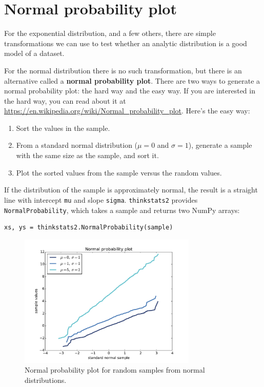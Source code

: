 \documentclass[12pt]{book}
\begin{document}
\section{Normal probability plot}

For the exponential distribution, and a few others, there are
simple transformations we can use to test whether an analytic
distribution is a good model of a dataset.

For the normal distribution there is no such transformation, but there
is an alternative called a {\bf normal probability plot}.  There
are two ways to generate a normal probability plot: the hard way
and the easy way.  If you are interested in the hard way, you can
read about it at \url{https://en.wikipedia.org/wiki/Normal_probability_plot}.
Here's the easy way:

\begin{enumerate}

\item Sort the values in the sample.

\item From a standard normal distribution ($\mu=0$ and $\sigma=1$),
generate a sample with the same size as the sample, and sort it.

\item Plot the sorted values from the sample versus the random values.

\end{enumerate}

If the distribution of the sample is approximately normal, the result
is a straight line with intercept {\tt mu} and slope {\tt sigma}.
{\tt thinkstats2} provides {\tt NormalProbability}, which takes a
sample and returns two NumPy arrays:

\begin{verbatim}
xs, ys = thinkstats2.NormalProbability(sample)
\end{verbatim}

\begin{figure}
\centerline{\includegraphics[height=2.5in]{figs/analytic_normal_prob_example.pdf}}
\caption{Normal probability plot for random samples from normal distributions.}
\label{analytic_normal_prob_example}
\end{figure}
\end{document}
